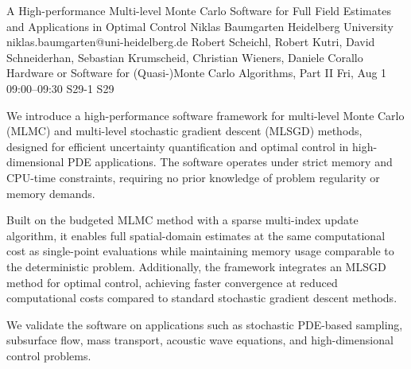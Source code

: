 \begin{talk}
  {A High-performance Multi-level Monte Carlo Software for Full Field Estimates and Applications in Optimal Control}%
  {Niklas Baumgarten}%
  {Heidelberg University}%
  {niklas.baumgarten@uni-heidelberg.de}%
  {Robert Scheichl, Robert Kutri, David Schneiderhan, Sebastian Krumscheid, Christian Wieners, Daniele Corallo}%
  {Hardware or Software for (Quasi-)Monte Carlo Algorithms, Part II}%
  {Fri, Aug 1 09:00--09:30}%
  {S29-1}%
  {S29}%


We introduce a high-performance software framework for multi-level Monte Carlo (MLMC)
and multi-level stochastic gradient descent (MLSGD) methods,
designed for efficient uncertainty quantification and optimal control in high-dimensional PDE applications.
The software operates under strict memory and CPU-time constraints,
requiring no prior knowledge of problem regularity or memory demands.

Built on the budgeted MLMC method with a sparse multi-index update algorithm,
it enables full spatial-domain estimates at the same computational cost as single-point
evaluations while maintaining memory usage comparable to the deterministic problem.
Additionally, the framework integrates an MLSGD method for optimal control,
achieving faster convergence at reduced computational costs compared to standard
stochastic gradient descent methods.

We validate the software on applications such as stochastic PDE-based sampling, subsurface flow,
mass transport, acoustic wave equations, and high-dimensional control problems.


\end{talk}

